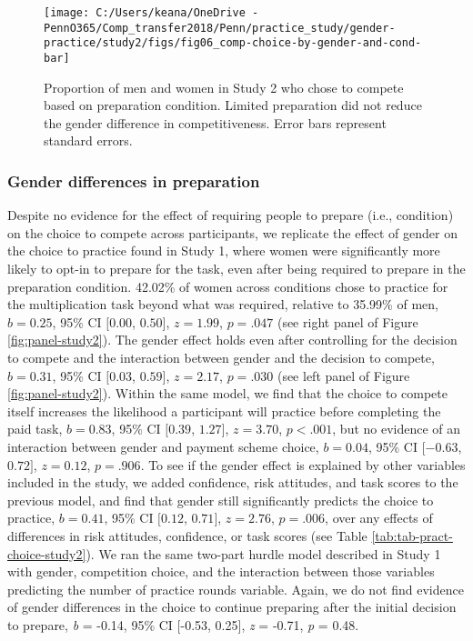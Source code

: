 \documentclass[letterpaper, nobind]{templates/ociamthesis}
\begin{document}
\begin{figure}

{\centering \texttt{[image: C:/Users/keana/OneDrive - PennO365/Comp\_transfer2018/Penn/practice\_study/gender-practice/study2/figs/fig06\_comp-choice-by-gender-and-cond-bar]} 

}

\caption{Proportion of men and women in Study 2 who chose to compete based on preparation condition. Limited preparation did not reduce the gender difference in competitiveness. Error bars represent standard errors.}\label{fig:s200}
\end{figure}

\newpage

\hypertarget{gender-differences-in-preparation-2}{%
\subsubsection{Gender differences in preparation}\label{gender-differences-in-preparation-2}}

Despite no evidence for the effect of requiring people to prepare (i.e., condition) on the choice to compete across participants, we replicate the effect of gender on the choice to practice found in Study 1, where women were significantly more likely to opt-in to prepare for the task, even after being required to prepare in the preparation condition. 42.02\% of women across conditions chose to practice for the multiplication task beyond what was required, relative to 35.99\% of men, \(b = 0.25\), 95\% CI \([0.00\), \(0.50]\), \(z = 1.99\), \(p = .047\) (see right panel of Figure \ref{fig:panel-study2}). The gender effect holds even after controlling for the decision to compete and the interaction between gender and the decision to compete, \(b = 0.31\), 95\% CI \([0.03\), \(0.59]\), \(z = 2.17\), \(p = .030\) (see left panel of Figure \ref{fig:panel-study2}). Within the same model, we find that the choice to compete itself increases the likelihood a participant will practice before completing the paid task, \(b = 0.83\), 95\% CI \([0.39\), \(1.27]\), \(z = 3.70\), \(p < .001\), but no evidence of an interaction between gender and payment scheme choice, \(b = 0.04\), 95\% CI \([-0.63\), \(0.72]\), \(z = 0.12\), \(p = .906\). To see if the gender effect is explained by other variables included in the study, we added confidence, risk attitudes, and task scores to the previous model, and find that gender still significantly predicts the choice to practice, \(b = 0.41\), 95\% CI \([0.12\), \(0.71]\), \(z = 2.76\), \(p = .006\), over any effects of differences in risk attitudes, confidence, or task scores (see Table \ref{tab:tab-pract-choice-study2}). We ran the same two-part hurdle model described in Study 1 with gender, competition choice, and the interaction between those variables predicting the number of practice rounds variable. Again, we do not find evidence of gender differences in the choice to continue preparing after the initial decision to prepare, \emph{b} = -0.14, 95\% CI {[}-0.53, 0.25{]}, \emph{z} = -0.71, \emph{p} = 0.48.
\end{document}
